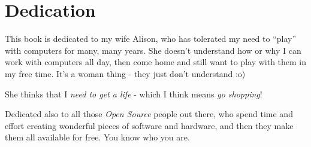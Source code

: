 \chapter{Dedication}\label{dedication}

This book is dedicated to my wife Alison, who has tolerated my need to ``play'' with computers for many, many years. She doesn't understand how or why I can work with computers all day, then come home and still want to play with them in my free time. It's a woman thing - they just don't understand :o)

She thinks that I \emph{need to get a life} - which I think means
\emph{go shopping}!

Dedicated also to all those \emph{Open Source} people out there, who spend time and effort creating wonderful pieces of software and hardware, and then they make them all available for free. You know who you are.
